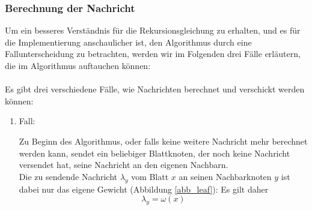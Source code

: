\subsubsection{Berechnung der Nachricht}

Um ein besseres Verständnis für die Rekursionsgleichung zu erhalten, und es für die Implementierung anschaulicher ist, den Algorithmus durch eine Fallunterscheidung zu betrachten, werden wir im Folgenden drei Fälle erläutern, die im Algorithmus auftauchen können:\\\\	
Es gibt drei verschiedene Fälle, wie Nachrichten berechnet und verschickt werden können:

\begin{enumerate}
	
	\item Fall:
		
		
		
			
		Zu Beginn des Algorithmus, oder falls keine weitere Nachricht mehr berechnet werden kann, sendet ein beliebiger Blattknoten, der noch keine Nachricht versendet hat, seine Nachricht an den eigenen Nachbarn.\\
		
		Die zu sendende Nachricht $\lambda_{y}$ vom Blatt $x$ an seinen Nachbarknoten $y$ ist dabei nur das eigene Gewicht (Abbildung \ref{abb_leaf}): Es gilt daher $$\lambda_{y} = \omega(x)$$
		


\end{enumerate}
